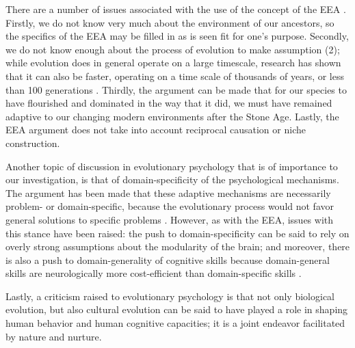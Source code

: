 There are a number of issues associated with the use of the concept of the EEA \citep{LB02}. Firstly, we do not know very much about the environment of our ancestors, so the specifics of the EEA may be filled in as is seen fit for one's purpose. Secondly, we do not know enough about the process of evolution to make assumption (2); while evolution does in general operate on a large timescale, research has shown that it can also be faster, operating on a time scale of thousands of years, or less than 100 generations \citep[pp.~190--191 and references therein]{LB02}. Thirdly, the argument can be made that for our species to have flourished and dominated in the way that it did, we must have remained adaptive to our changing modern environments after the Stone Age. Lastly, the EEA argument does not take into account reciprocal causation or niche construction.

Another topic of discussion in evolutionary psychology that is of importance to our investigation, is that of domain-specificity of the psychological mechanisms. The argument has been made that these adaptive mechanisms are necessarily problem- or domain-specific, because the evolutionary process would not favor general solutions to specific problems \citep[p.~50]{Buss15}.
However, as with the EEA, issues with this stance have been raised: the push to domain-specificity can be said to rely on overly strong assumptions about the modularity of the brain; and moreover, there is also a push to domain-generality of cognitive skills because domain-general skills are neurologically more cost-efficient than domain-specific skills \citep{LB02}.

Lastly, a criticism raised to evolutionary psychology is that not only biological evolution, but also cultural evolution can be said to have played a role in shaping human behavior and human cognitive capacities; it is a joint endeavor facilitated by nature and nurture.

